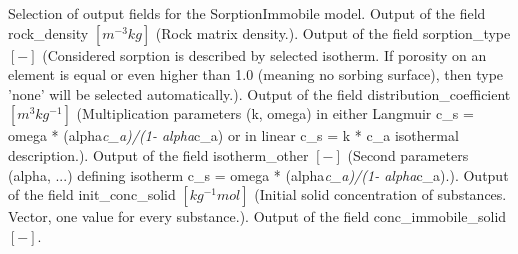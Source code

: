 \begin{SelectionType}
	{}
	{{{Selection of output fields for the SorptionImmobile model.}}}
		\KeyItem
			{}
			{{{Output of the field rock{\_}density }{$[m^{-3}kg]$}{ (Rock matrix density.).}}}
		\KeyItem
			{}
			{{{Output of the field sorption{\_}type }{$[-]$}{ (Considered sorption is described by selected isotherm. If porosity on an element is equal or even higher than 1.0 (meaning no sorbing surface), then type 'none' will be selected automatically.).}}}
		\KeyItem
			{}
			{{{Output of the field distribution{\_}coefficient }{$[m^{3}kg^{-1}]$}{ (Multiplication parameters (k, omega) in either Langmuir c{\_}s = omega * (alpha}\textit{c{\_}a)/(1- alpha}{c{\_}a) or in linear c{\_}s = k * c{\_}a isothermal description.).}}}
		\KeyItem
			{}
			{{{Output of the field isotherm{\_}other }{$[-]$}{ (Second parameters (alpha, ...) defining isotherm  c{\_}s = omega * (alpha}\textit{c{\_}a)/(1- alpha}{c{\_}a).).}}}
		\KeyItem
			{}
			{{{Output of the field init{\_}conc{\_}solid }{$[kg^{-1}mol]$}{ (Initial solid concentration of substances. Vector, one value for every substance.).}}}
		\KeyItem
			{}
			{{{Output of the field conc{\_}immobile{\_}solid }{$[-]$}{.}}}
\end{SelectionType}
